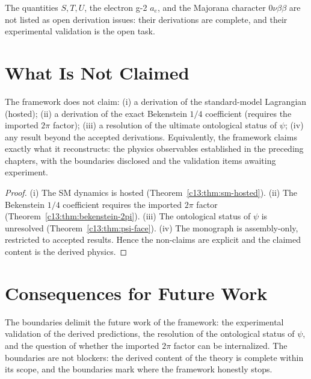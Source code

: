 \begin{corollary}
\label{c13:cor:no-open-validation}
The quantities $S,T,U$, the electron g-2 $a_e$, and the Majorana character $0\nu\beta\beta$
are not listed as open derivation issues: their derivations are complete, and their
experimental validation is the open task.
\end{corollary}

\section{What Is Not Claimed}
\label{c13:sec:not-claimed}

\begin{theorem}
\label{c13:thm:non-claims}
The framework does not claim: (i) a derivation of the standard-model Lagrangian (hosted);
(ii) a derivation of the exact Bekenstein $1/4$ coefficient (requires the imported $2\pi$
factor); (iii) a resolution of the ultimate ontological status of $\psi$; (iv) any result
beyond the accepted derivations. Equivalently, the framework claims exactly what it
reconstructs: the physics observables established in the preceding chapters, with the
boundaries disclosed and the validation items awaiting experiment.
\end{theorem}

\begin{proof}
(i) The SM dynamics is hosted \cite{c13:QG242,c13:QG245} (Theorem~\ref{c13:thm:sm-hosted}). (ii) The
Bekenstein $1/4$ coefficient requires the imported $2\pi$ factor \cite{c13:QG185,c13:QG196}
(Theorem~\ref{c13:thm:bekenstein-2pi}). (iii) The ontological status of $\psi$ is unresolved
(Theorem~\ref{c13:thm:psi-face}). (iv) The monograph is assembly-only, restricted to
accepted results. Hence the non-claims are explicit and the claimed content is the derived
physics.
\end{proof}

\section{Consequences for Future Work}
\label{c13:sec:future-work}

\begin{theorem}
\label{c13:thm:future-work}
The boundaries delimit the future work of the framework: the experimental validation of the
derived predictions, the resolution of the ontological status of $\psi$, and the question
of whether the imported $2\pi$ factor can be internalized. The boundaries are not blockers:
the derived content of the theory is complete within its scope, and the boundaries mark
where the framework honestly stops.
\end{theorem}

